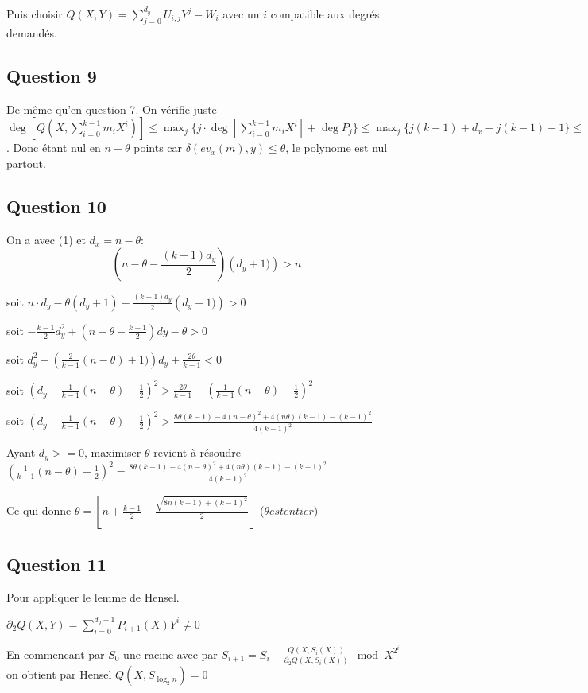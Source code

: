 \documentclass{article}
\begin{document}
Puis choisir $Q(X,Y)=\sum_{j=0}^{d_y}U_{i,j}Y^j-W_i$ avec un $i$ compatible aux degrés demandés.

\subsection*{Question 9}

De même qu'en question 7. On vérifie juste $\deg \left[ Q(X,\sum_{i=0}^{k-1}m_iX^i) \right] \leq \max_j \{j\cdot \deg [\sum_{i=0}^{k-1}m_iX^i]+\deg P_j \} \leq \max_j \{j (k-1)+d_x-j(k-1)-1 \}\leq \max_j \{d_x-1 \}\leq d_x-1 < {n-\theta }$. Donc étant nul en $n-\theta$ points car $\delta(ev_x(m),y)\leq\theta$, le polynome est nul partout.

\subsection*{Question 10}

On a avec (1) et $d_x=n-\theta$:
$$ \left(n-\theta-\frac{(k-1)d_y}{2}\right)\left(d_y+1)\right)>n$$

soit $n\cdot d_y-\theta(d_y+1)-\frac{(k-1)d_y}{2}\left(d_y+1)\right)>0$

soit $-\frac{k-1}{2}d_y^2+\left(n-\theta-\frac{k-1}{2}\right)dy-\theta>0$
  
soit $d_y^2-\left(\frac{2}{k-1}(n-\theta)+1)\right)d_y+\frac{2\theta}{k-1}<0$

soit $\left(d_y-\frac{1}{k-1}(n-\theta)-\frac{1}{2}\right)^2>\frac{2\theta}{k-1}-\left(\frac{1}{k-1}(n-\theta)-\frac{1}{2}\right)^2$

soit $\left(d_y-\frac{1}{k-1}(n-\theta)-\frac{1}{2}\right)^2>\frac{8\theta(k-1)-4(n-\theta)^2+4(n\theta)(k-1)-(k-1)^2}{4(k-1)^2}$

Ayant $d_y>=0$, maximiser $\theta$ revient à résoudre $\left(\frac{1}{k-1}(n-\theta)+\frac{1}{2}\right)^2=\frac{8\theta(k-1)-4(n-\theta)^2+4(n\theta)(k-1)-(k-1)^2}{4(k-1)^2}$

Ce qui donne $\theta=\left\lfloor n+\frac{k-1}{2}-\frac{\sqrt{8n(k-1)+(k-1)^2}}{2}\right\rfloor$ ($\theta est entier$)


\subsection*{Question 11}

Pour appliquer le lemme de Hensel.

$\partial_2 Q(X,Y)=\sum_{i=0}^{d_y-1}P_{i+1}(X)Y^i\neq 0$

En commencant par $S_0$ une racine avec par $S_{i+1}=S_i-\frac{Q(X,S_i(X))}{\partial _2 Q(X,S_i(X))} \mod X^{2^i}$ on obtient par Hensel $Q(X,S_{\log_2 n})=0$ 
\end{document}
